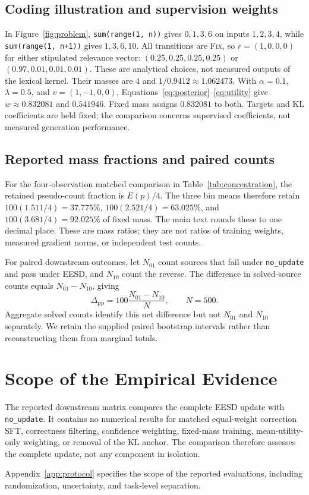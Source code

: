 \documentclass{article}
\newcommand{\method}{\textsc{EESD}\xspace}
\newcommand{\fix}{\textsc{Fix}\xspace}
\begin{document}
\subsection{Coding illustration and supervision weights}
\label{app:coding-illustration}
In Figure~\ref{fig:problem}, \texttt{sum(range(1, n))} gives $0,1,3,6$
on inputs $1,2,3,4$, while \texttt{sum(range(1, n+1))} gives
$1,3,6,10$. All transitions are \fix, so $r=(1,0,0,0)$ for either
stipulated relevance vector: $(0.25,0.25,0.25,0.25)$ or
$(0.97,0.01,0.01,0.01)$. These are analytical choices, not measured
outputs of the lexical kernel. Their masses are $4$ and
$1/0.9412\approx1.062473$. With $\alpha=0.1$, $\lambda=0.5$, and
$v=(1,-1,0,0)$, Equations~\ref{eq:posterior}--\ref{eq:utility} give
$w\approx0.832081$ and $0.541946$. Fixed mass assigns $0.832081$ to
both. Targets and KL coefficients are held fixed; the comparison
concerns supervised coefficients, not measured generation performance.

\subsection{Reported mass fractions and paired counts}


For the four-observation matched comparison in Table~\ref{tab:concentration},
the retained pseudo-count fraction is $E(p)/4$. The three bin means therefore
retain $100(1.511/4)=37.775\%$, $100(2.521/4)=63.025\%$, and
$100(3.681/4)=92.025\%$ of fixed mass. The main text rounds these to one
decimal place. These are mass ratios; they are not ratios of training
weights, measured gradient norms, or independent test counts.

For paired downstream outcomes, let $N_{01}$ count sources that fail under
\texttt{no\_update} and pass under \method, and $N_{10}$ count the reverse.
The difference in solved-source counts equals $N_{01}-N_{10}$, giving
\[
\Delta_{\mathrm{pp}}=100\frac{N_{01}-N_{10}}{N},\qquad N=500.
\]
Aggregate solved counts identify this net difference but not $N_{01}$ and
$N_{10}$ separately. We retain the supplied paired bootstrap intervals
rather than reconstructing them from marginal totals.

\section{Scope of the Empirical Evidence}
\label{app:future}

The reported downstream matrix compares the complete \method update with
\texttt{no\_update}. It contains no numerical results for matched equal-weight
correction SFT, correctness filtering, confidence weighting, fixed-mass
training, mean-utility-only weighting, or removal of the KL anchor. The
comparison therefore assesses the complete update, not any component in
isolation.

Appendix~\ref{app:protocol} specifies the scope of the reported
evaluations, including randomization, uncertainty, and task-level separation.


\end{document}
